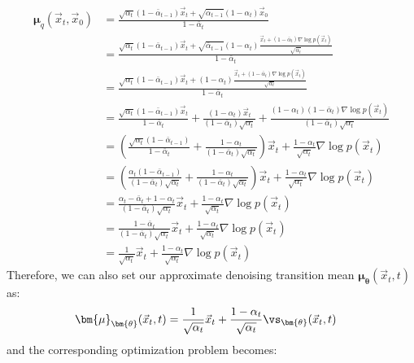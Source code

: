 \begin{align}
\bm{\mu}_q(\vec{x}_t, \vec{x}_0) &= \frac{\sqrt{\alpha_t}(1-\bar\alpha_{t-1})\vec{x}_{t} + \sqrt{\bar\alpha_{t-1}}(1-\alpha_t)\vec{x}_0}{1 -\bar\alpha_{t}}\\
&= \frac{\sqrt{\alpha_t}(1-\bar\alpha_{t-1})\vec{x}_{t} + \sqrt{\bar\alpha_{t-1}}(1-\alpha_t)\frac{\vec{x}_t + (1 - \bar\alpha_t)\nabla\log p(\vec{x}_t)}{\sqrt{\bar\alpha_t}}}{1 -\bar\alpha_{t}}\\
&= \frac{\sqrt{\alpha_t}(1-\bar\alpha_{t-1})\vec{x}_{t} + (1-\alpha_t)\frac{\vec{x}_t + (1 - \bar\alpha_t)\nabla\log p(\vec{x}_t)}{\sqrt{\alpha_t}}}{1 -\bar\alpha_{t}}\\
&= \frac{\sqrt{\alpha_t}(1-\bar\alpha_{t-1})\vec{x}_{t}}{1 - \bar\alpha_t} + \frac{(1-\alpha_t)\vec{x}_t}{(1-\bar\alpha_t)\sqrt{\alpha_t}} + \frac{(1 - \alpha_t)(1 - \bar\alpha_t)\nabla\log p(\vec{x}_t)}{(1-\bar\alpha_t)\sqrt{\alpha_t}}\\
&= \left(\frac{\sqrt{\alpha_t}(1-\bar\alpha_{t-1})}{1 - \bar\alpha_t} + \frac{1-\alpha_t}{(1-\bar\alpha_t)\sqrt{\alpha_t}}\right)\vec{x}_t + \frac{1 - \alpha_t}{\sqrt{\alpha_t}}\nabla\log p(\vec{x}_t)\\
&= \left(\frac{\alpha_t(1-\bar\alpha_{t-1})}{(1 - \bar\alpha_t)\sqrt{\alpha_t}} + \frac{1-\alpha_t}{(1-\bar\alpha_t)\sqrt{\alpha_t}}\right)\vec{x}_t + \frac{1 - \alpha_t}{\sqrt{\alpha_t}}\nabla\log p(\vec{x}_t)\\
&= \frac{\alpha_t-\bar\alpha_{t} + 1-\alpha_t}{(1 - \bar\alpha_t)\sqrt{\alpha_t}}\vec{x}_t + \frac{1 - \alpha_t}{\sqrt{\alpha_t}}\nabla\log p(\vec{x}_t)\\
&= \frac{1-\bar\alpha_t}{(1 - \bar\alpha_t)\sqrt{\alpha_t}}\vec{x}_t + \frac{1 - \alpha_t}{\sqrt{\alpha_t}}\nabla\log p(\vec{x}_t)\\
&= \frac{1}{\sqrt{\alpha_t}}\vec{x}_t + \frac{1 - \alpha_t}{\sqrt{\alpha_t}}\nabla\log p(\vec{x}_t)
\end{align}
Therefore, we can also set our approximate denoising transition mean $\bm{\mu}_{\bm{\theta}}(\vec{x}_t, t)$ as:
\begin{align}
\bm{\mu}_{\bm{\theta}}(\vec{x}_t, t) &= \frac{1}{\sqrt{\alpha_t}}\vec{x}_t + \frac{1 - \alpha_t}{\sqrt{\alpha_t}}\vs_{\bm{\theta}}(\vec{x}_t, t)
\end{align}
and the corresponding optimization problem becomes:
